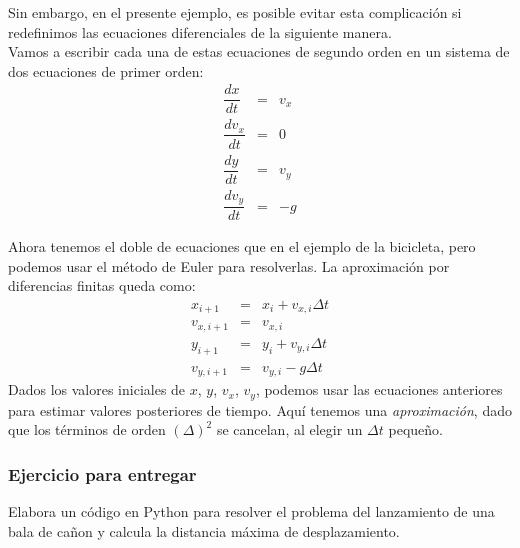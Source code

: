 \begin{frame}
Sin embargo, en el presente ejemplo, es posible evitar esta complicación si redefinimos las ecuaciones diferenciales de la siguiente manera.
\\
\medskip
Vamos a escribir cada una de estas ecuaciones de segundo orden en un sistema de dos ecuaciones de primer orden:
\begin{eqnarray*}
\dfrac{dx}{dt} &=& v_{x} \\
\dfrac{dv_{x}}{dt} &=& 0 \\
\dfrac{dy}{dt} &=& v_{y} \\
\dfrac{dv_{y}}{dt} &=& -g
\end{eqnarray*}
\end{frame}
\begin{frame}
Ahora tenemos el doble de ecuaciones que en el ejemplo de la bicicleta, pero podemos usar el método de Euler para resolverlas. La aproximación por diferencias finitas queda como:
\begin{eqnarray*}
x_{i+1} &=& x_{i} + v_{x,i} \Delta t \\
v_{x,i+1} &=& v_{x,i} \\
y_{i+1} &=& y_{i} + v_{y,i} \Delta t \\
v_{y,i+1} &=& v_{y,i} - g \Delta t
\end{eqnarray*}
Dados los valores iniciales de $x$, $y$, $v_{x}$, $v_{y}$, podemos usar las ecuaciones anteriores para estimar valores posteriores de tiempo. Aquí tenemos una \emph{aproximación}, dado que los términos de orden $(\Delta)^{2}$ se cancelan, al elegir un $\Delta t$ pequeño. 
\end{frame}
\begin{frame}
\frametitle{Ejercicio para entregar}
Elabora un código en Python para resolver el problema del lanzamiento de una bala de cañon y calcula la distancia máxima de desplazamiento.
\end{frame}
